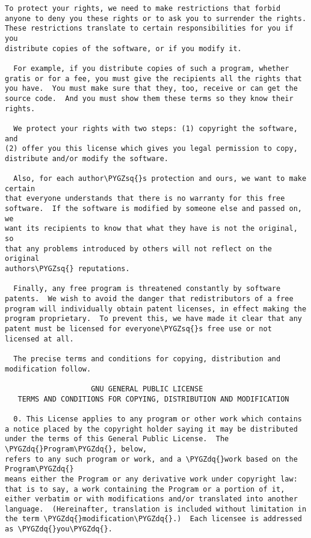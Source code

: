 \documentclass[letterpaper,10pt,english]{sphinxmanual}
\def\PYGZsq{\char`\'}
\def\PYGZdq{\char`\"}
\begin{document}
\begin{Verbatim}[commandchars=\\\{\}]
  To protect your rights, we need to make restrictions that forbid
anyone to deny you these rights or to ask you to surrender the rights.
These restrictions translate to certain responsibilities for you if you
distribute copies of the software, or if you modify it.

  For example, if you distribute copies of such a program, whether
gratis or for a fee, you must give the recipients all the rights that
you have.  You must make sure that they, too, receive or can get the
source code.  And you must show them these terms so they know their
rights.

  We protect your rights with two steps: (1) copyright the software, and
(2) offer you this license which gives you legal permission to copy,
distribute and/or modify the software.

  Also, for each author\PYGZsq{}s protection and ours, we want to make certain
that everyone understands that there is no warranty for this free
software.  If the software is modified by someone else and passed on, we
want its recipients to know that what they have is not the original, so
that any problems introduced by others will not reflect on the original
authors\PYGZsq{} reputations.

  Finally, any free program is threatened constantly by software
patents.  We wish to avoid the danger that redistributors of a free
program will individually obtain patent licenses, in effect making the
program proprietary.  To prevent this, we have made it clear that any
patent must be licensed for everyone\PYGZsq{}s free use or not licensed at all.

  The precise terms and conditions for copying, distribution and
modification follow.

                    GNU GENERAL PUBLIC LICENSE
   TERMS AND CONDITIONS FOR COPYING, DISTRIBUTION AND MODIFICATION

  0. This License applies to any program or other work which contains
a notice placed by the copyright holder saying it may be distributed
under the terms of this General Public License.  The \PYGZdq{}Program\PYGZdq{}, below,
refers to any such program or work, and a \PYGZdq{}work based on the Program\PYGZdq{}
means either the Program or any derivative work under copyright law:
that is to say, a work containing the Program or a portion of it,
either verbatim or with modifications and/or translated into another
language.  (Hereinafter, translation is included without limitation in
the term \PYGZdq{}modification\PYGZdq{}.)  Each licensee is addressed as \PYGZdq{}you\PYGZdq{}.


\end{Verbatim}
\end{document}
